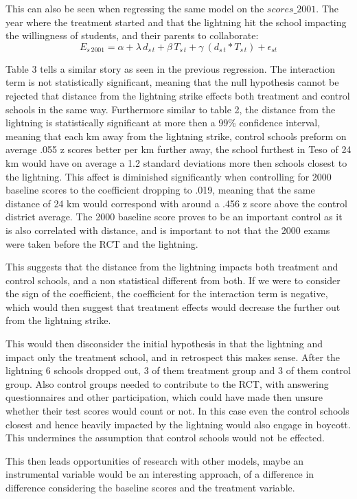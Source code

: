 \documentclass{article}
\begin{document}
This can also be seen when regressing the same model on the $scores\_2001$. The year where the treatment started and that the lightning hit the school impacting the willingness of students, and their parents to collaborate: \[ E_{s\,2001} = \alpha + \lambda\,d_{s\,t} + \beta\,T_{s\,t} +  \gamma\ (d_{s\,t}* T_{s\,t})+ \epsilon_{s t}\]

\begin{table}[H] %
  \caption{OLS for 2001 test scores}
\end{table}

Table 3 tells a similar story as seen in the previous regression. The interaction term is not statistically significant, meaning that the null hypothesis cannot be rejected that distance from the lightning strike effects both treatment and control schools in the same way. Furthermore similar to table 2, the distance from the lightning is statistically significant at more then a 99\% confidence interval, meaning that each km away from the lightning strike, control schools preform on average .055 z scores better per km further away, the school furthest in Teso of 24 km would have on average a 1.2 standard deviations more then schools closest to the lightning. This affect is diminished significantly when controlling for 2000 baseline scores to the coefficient dropping to .019, meaning that the same distance of 24 km would correspond with around a .456 z score above the control district average. The 2000 baseline score proves to be an important control as it is also correlated with distance, and is important to not that the 2000 exams were taken before the RCT and the lightning. 

This suggests that the distance from the lightning impacts both treatment and control schools, and a non statistical different from both. If we were to consider the sign of the coefficient, the coefficient for the interaction term is negative, which would then suggest that treatment effects would decrease the further out from the lightning strike. 

This would then disconsider the initial hypothesis in that the lightning and impact only the treatment school, and in retrospect this makes sense. After the lightning 6 schools dropped out, 3 of them treatment group and 3 of them control group. Also control groups needed to contribute to the RCT, with answering questionnaires and other participation, which could have made then unsure whether their test scores would count or not. In this case even the control schools closest and hence heavily impacted by the lightning would also engage in boycott. This undermines the assumption that control schools would not be effected. 

This then leads opportunities of research with other models, maybe an instrumental variable would be an interesting approach, of a difference in difference considering the baseline scores and the treatment variable.

\newpage
\printbibliography
\end{document}
